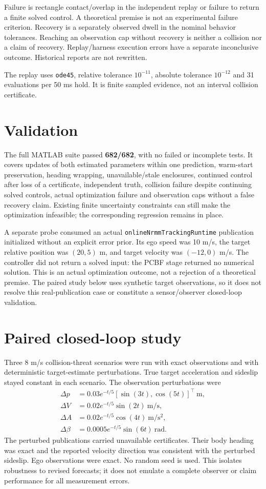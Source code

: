 \documentclass[11pt]{article}
\begin{document}
Failure is rectangle contact/overlap in the independent replay or failure to
return a finite solved control. A theoretical premise is not an experimental
failure criterion. Recovery is a separately observed dwell in the nominal
behavior tolerances. Reaching an observation cap without recovery is neither
a collision nor a claim of recovery. Replay/harness execution errors have a
separate inconclusive outcome. Historical reports are not rewritten.

The replay uses \texttt{ode45}, relative tolerance $10^{-11}$, absolute
tolerance $10^{-12}$ and 31 evaluations per 50 ms hold. It is finite sampled
evidence, not an interval collision certificate.

\section{Validation}
The full MATLAB suite passed \textbf{682/682}, with no failed or
incomplete tests. It covers updates of both estimated parameters within one
prediction, warm-start preservation, heading wrapping, unavailable/stale
enclosures, continued control after loss of a certificate, independent truth,
collision failure despite continuing solved controls, actual optimization
failure and observation caps without a false recovery claim. Existing
finite uncertainty constraints can still make the optimization infeasible;
the corresponding regression remains in place.

A separate probe consumed an actual \texttt{onlineNrmmTrackingRuntime}
publication initialized without an explicit error prior. Its ego speed was
10 m/s, the target relative position was $(20,5)$ m, and target velocity was
$(-12,0)$ m/s. The controller did not return a solved input: the PCBF stage returned no numerical solution. This is an actual
optimization outcome, not a rejection of a theoretical premise. The paired
study below uses synthetic target observations, so it does not resolve this
real-publication case or constitute a sensor/observer closed-loop validation.

\section{Paired closed-loop study}
Three 8 m/s collision-threat scenarios were run with exact observations and
with deterministic target-estimate perturbations. True target acceleration
and sideslip stayed constant in each scenario. The observation perturbations
were
\begin{align*}
 \Delta p&=0.03e^{-t/5}[\sin(3t),\cos(5t)]^\top\ \mathrm m,\\
 \Delta V&=0.02e^{-t/5}\sin(2t)\ \mathrm{m/s},\\
 \Delta A&=0.02e^{-t/5}\cos(4t)\ \mathrm{m/s^2},\\
 \Delta\beta&=0.0005e^{-t/5}\sin(6t)\ \mathrm{rad}.
\end{align*}
The perturbed publications carried unavailable certificates. Their body
heading was exact and the reported velocity direction was consistent with
the perturbed sideslip. Ego observations were exact. No random seed is used.
This isolates robustness to revised forecasts; it does not emulate a complete
observer or claim performance for all measurement errors.
\end{document}
